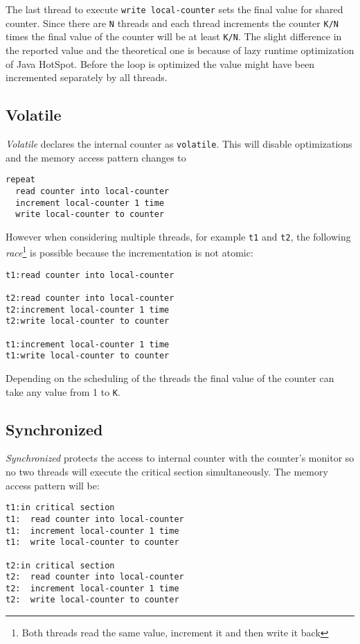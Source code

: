 \documentclass[12pt]{article}
\begin{document}
The last thread to execute \texttt{write local-counter} sets the final
value for shared counter. Since there are \texttt{N} threads and each thread
increments the counter \texttt{K/N} times the final value of the counter
will be at least \texttt{K/N}. The slight difference in the reported value
and the theoretical one is because of lazy runtime optimization of Java HotSpot.
Before the loop is optimized the value might have been incremented separately
by all threads.

\subsection{Volatile}
\emph{Volatile} declares the internal counter as \texttt{volatile}.
This will disable optimizations and the memory access pattern changes to

\begin{verbatim}
repeat
  read counter into local-counter
  increment local-counter 1 time
  write local-counter to counter
\end{verbatim}

However when considering multiple threads, for example \texttt{t1} and
\texttt{t2}, the following \emph{race}\footnote{Both threads read the
same value, increment it and then write it back} is possible because
the incrementation is not atomic:

\begin{verbatim}
t1:read counter into local-counter

t2:read counter into local-counter
t2:increment local-counter 1 time
t2:write local-counter to counter

t1:increment local-counter 1 time
t1:write local-counter to counter
\end{verbatim}

Depending on the scheduling of the threads the final value of the counter can
take any value from 1 to \texttt{K}.

\subsection{Synchronized}

\emph{Synchronized} protects the access to internal counter with
the counter's monitor so no two threads will execute the critical
section simultaneously. The memory access pattern will be:

\begin{verbatim}
t1:in critical section
t1:  read counter into local-counter
t1:  increment local-counter 1 time
t1:  write local-counter to counter

t2:in critical section
t2:  read counter into local-counter
t2:  increment local-counter 1 time
t2:  write local-counter to counter
\end{verbatim}
\end{document}
